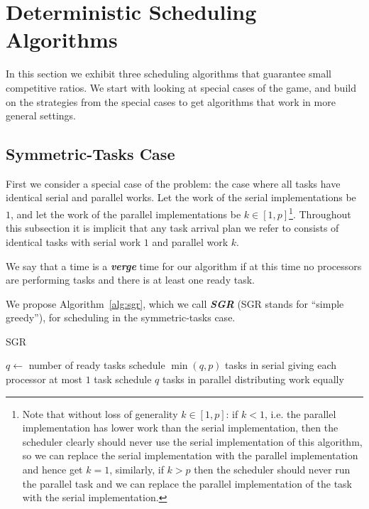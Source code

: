 \documentclass[twocolumn]{article}[10pt]
\newcommand{\defn}[1]{{\textit{\textbf{\boldmath #1}}}\xspace}
\begin{document}
\section{Deterministic Scheduling Algorithms}

In this section we exhibit three scheduling algorithms that
guarantee small competitive ratios. We start with looking at
special cases of the game, and build on the strategies from the
special cases to get algorithms that work in more general
settings.

\subsection{Symmetric-Tasks Case}
\label{subsec:symmetrictasks}
First we consider a special case of the problem: the case where
all tasks have identical serial and parallel works. Let
the work of the serial implementations be $1$, and let the work
of the parallel implementations be $k \in [1, p]$\footnote{Note that
without loss of generality $k \in [1,p]$: if $k < 1$, i.e. the
parallel implementation has lower work than the serial
implementation, then the scheduler clearly should never use the serial
implementation of this algorithm, so we can replace the serial
implementation with the parallel implementation and hence get
$k=1$, similarly, if $k > p$ then the scheduler should never run
the parallel task and we can replace the parallel implementation
of the task with the serial implementation.}. Throughout this
subsection it is implicit that any task arrival plan we
refer to consists of identical tasks with serial work $1$ and parallel work $k$.

We say that a time is a \defn{verge} time for our algorithm if at
this time no processors are performing tasks and there is at
least one ready task.

We propose Algorithm~\ref{alg:sgr}, which we call \defn{SGR}
(SGR stands for \enquote{simple greedy}),
for scheduling in the symmetric-tasks case.

\begin{algorithm}
  \caption{SGR}
  \label{alg:sgr}
  \begin{algorithmic}
        \State $q \gets $ number of ready tasks
          \State schedule $\min(q, p)$ tasks in serial
          \State giving each processor at most $1$ task
        \Else
          \State schedule $q$ tasks in parallel
          \State distributing work equally 
        \EndIf
      \EndIf
    \EndWhile
  \end{algorithmic}
\end{algorithm}
\end{document}
